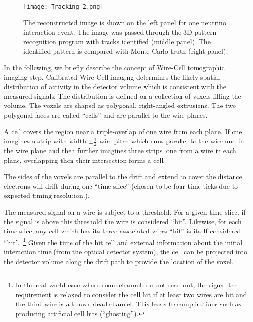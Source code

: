 \begin{figure}[!ht]
 \texttt{[image: Tracking\_2.png]}
\caption[Reconstructed image for one neutrino interaction event; comparison to MC]{The reconstructed image is shown 
on the left panel for one neutrino interaction event. The image 
was passed through the 3D pattern recognition program with tracks 
identified (middle panel). The identified pattern is compared 
with Monte-Carlo truth (right panel).}
\label{tracking2}
\end{figure}


In the following, we briefly describe the concept of Wire-Cell tomographic imaging step.
Calibrated Wire-Cell imaging determines the likely spatial distribution of
activity in the detector volume which is consistent with the measured
signals.  The distribution is defined on a collection of voxels
filling the volume.  The voxels are shaped as polygonal, right-angled
extrusions.  The two polygonal faces are called ``cells'' and are
parallel to the wire planes.

A cell covers the region near a triple-overlap of one wire from each
plane.  If one imagines a strip with width $\pm\frac{1}{2}$ wire pitch
which runs parallel to the wire and in the wire plane and then further
imagines three strips, one from a wire in each plane, overlapping then
their intersection forms a cell.

The sides of the voxels are parallel to the drift and extend to cover
the distance electrons will drift during one ``time slice'' (chosen to be four
time ticks due to expected timing resolution.).

The measured signal on a wire is subject to a threshold.  For a given
time slice, if the signal is above this threshold the wire is
considered ``hit''.  Likewise, for each time slice, any cell which has
its three associated wires ``hit'' is itself considered
``hit''.~\footnote{In the real world case where some channels do not
  read out, the signal the requirement is relaxed to consider the cell
  hit if at least two wires are hit and the third wire is a known dead 
channel.  This leads to complications such
  as producing artificial cell hits (``ghosting'').}  Given the time
of the hit cell and external information about the initial interaction
time (from the optical detector system), the cell can be projected
into the detector volume along the drift path to provide the location
of the voxel.

